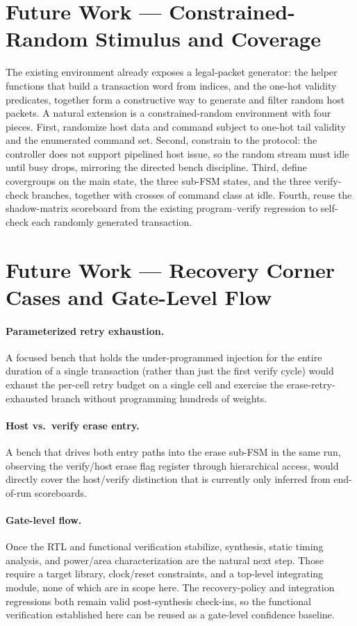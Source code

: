 \section{Future Work --- Constrained-Random Stimulus and Coverage}
\label{sec:future-cr}

The existing environment already exposes a legal-packet generator: the
helper functions that build a transaction word from indices, and the
one-hot validity predicates, together form a constructive way to
generate and filter random host packets. A natural extension is a
constrained-random environment with four pieces. First, randomize host
data and command subject to one-hot tail validity and the enumerated
command set. Second, constrain to the protocol: the controller does not
support pipelined host issue, so the random stream must idle until busy
drops, mirroring the directed bench discipline. Third, define
covergroups on the main state, the three sub-FSM states, and the three
verify-check branches, together with crosses of command class at idle.
Fourth, reuse the shadow-matrix scoreboard from the existing
program--verify regression to self-check each randomly generated
transaction.

\section{Future Work --- Recovery Corner Cases and Gate-Level Flow}
\label{sec:future-next}

\paragraph{Parameterized retry exhaustion.}
A focused bench that holds the under-programmed injection for the
entire duration of a single transaction (rather than just the first
verify cycle) would exhaust the per-cell retry budget on a single cell
and exercise the erase-retry-exhausted branch without programming
hundreds of weights.

\paragraph{Host vs.\ verify erase entry.}
A bench that drives both entry paths into the erase sub-FSM in the
same run, observing the verify/host erase flag register through
hierarchical access, would directly cover the host/verify distinction
that is currently only inferred from end-of-run scoreboards.

\paragraph{Gate-level flow.}
Once the RTL and functional verification stabilize, synthesis, static
timing analysis, and power/area characterization are the natural next
step. Those require a target library, clock/reset constraints, and a
top-level integrating module, none of which are in scope here. The
recovery-policy and integration regressions both remain valid
post-synthesis check-ins, so the functional verification established
here can be reused as a gate-level confidence baseline.
